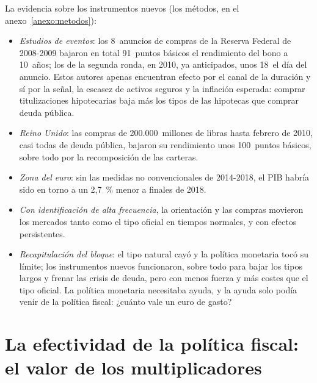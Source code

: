 \documentclass[11pt]{article}
\begin{document}
\begin{anotaciones}
La evidencia sobre los instrumentos nuevos (los métodos, en el anexo~\ref{anexo:metodos}):
\begin{itemize}
\item \emph{Estudios de eventos}: los 8~anuncios de compras de la Reserva Federal de 2008-2009 bajaron en total 91~puntos básicos el rendimiento del bono a 10~años\nocite{GagnonEtAl2011Financial}; los de la segunda ronda, en 2010, ya anticipados, unos 18~el día del anuncio\nocite{KrishnamurthyVissingJorgensen2011}. Estos autores apenas encuentran efecto por el canal de la duración y sí por la señal, la escasez de activos seguros y la inflación esperada: comprar titulizaciones hipotecarias baja más los tipos de las hipotecas que comprar deuda pública.
\item \emph{Reino Unido}: las compras de 200.000~millones de libras hasta febrero de 2010, casi todas de deuda pública, bajaron su rendimiento unos 100~puntos básicos, sobre todo por la recomposición de las carteras\nocite{JoyceEtAl2010Financial}.
\item \emph{Zona del euro}: sin las medidas no convencionales de 2014-2018, el PIB habría sido en torno a un 2,7~\% menor a finales de 2018\nocite{RostagnoEtAl2021Monetary}.
\item \emph{Con identificación de alta frecuencia}, la orientación y las compras movieron los mercados tanto como el tipo oficial en tiempos normales, y con efectos persistentes\nocite{Swanson2021Measuring}.
\end{itemize}
\end{anotaciones}

\begin{itemize}
\item \emph{Recapitulación del bloque}: el tipo natural cayó y la política monetaria tocó su límite; los instrumentos nuevos funcionaron, sobre todo para bajar los tipos largos y frenar las crisis de deuda, pero con menos fuerza y más costes que el tipo oficial. La política monetaria necesitaba ayuda, y la ayuda solo podía venir de la política fiscal: ¿cuánto vale un euro de gasto?
\end{itemize}

\section{La efectividad de la política fiscal:\cortetitulo{} el valor de los multiplicadores}\label{sec:fiscal}
\end{document}
